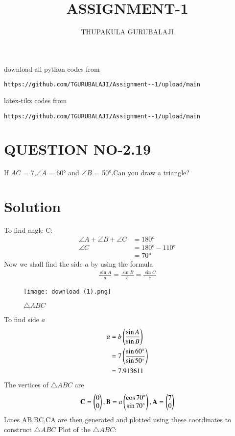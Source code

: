 \documentclass[journal,12pt,twocolumn]{IEEEtran}
\begin{document}
     \def\rightbox#1{\makebox[0in][r]{#1}}
     \def\centbox#1{\makebox[0in]{#1}}
     \def\topbox#1{\raisebox{-\baselineskip}[0in][0in]{#1}}
     \def\midbox#1{\raisebox{-0.5\baselineskip}[0in][0in]{#1}}
\vspace{3cm}
\title{ASSIGNMENT-1}
\author{THUPAKULA GURUBALAJI}
\maketitle
\newpage
\bigskip
\renewcommand{\thefigure}{\theenumi}
\renewcommand{\thetable}{\theenumi}
%
download all python codes from 
%
\begin{lstlisting}
https://github.com/TGURUBALAJI/Assignment--1/upload/main
\end{lstlisting}
%
latex-tikz codes from
%
\begin{lstlisting}
https://github.com/TGURUBALAJI/Assignment--1/upload/main
\end{lstlisting}
%
\section{QUESTION NO-2.19}
 \noindent If  $AC$ = 7,$\angle{A}$ = \ang{60} and $\angle{B}$ = \ang{50}.Can you draw a triangle?
%
\section{Solution}
To find angle C:
\begin{align}
\angle{A} + \angle{B} + \angle{C} &= \ang{180}
\\
\angle{C} &= \ang{180} - \ang{110}
\\
&= \ang{70}
\end{align}
Now we shall find the side $a$ by using the formula
\begin{align}
\frac{\sin{A}}{a} = \frac{\sin{B}}{b} = \frac{\sin{C}}{c}
\end{align}
\begin{figure}[!h]
\texttt{[image: download (1).png]}
\caption{$\triangle ABC$}
\label{fig:triangle}	
\end{figure}
To find side $a$
\begin{align}
a&= b\left(\frac{\sin{A}}{\sin{B}}\right) 
\\
&= 7 \left(\frac{\sin{\ang{60}}}{\sin{\ang{50}}}\right)
\\
&= 7.913611
\end{align}
The vertices of $\triangle ABC$ are
\begin{align}
\mathbf{C} =\begin{pmatrix}0 \\ 0\end{pmatrix},
\mathbf{B} =a\begin{pmatrix}\cos{\ang{70}} \\ \sin{\ang{70}}\end{pmatrix},
\mathbf{A} =\begin{pmatrix}7 \\ 0\end{pmatrix}
\end{align}
Lines AB,BC,CA are then generated and plotted using these coordinates to construct $\triangle ABC$
Plot of the $\triangle ABC$:
\end{document}
